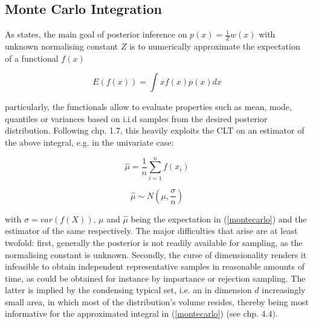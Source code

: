 \documentclass[11pt]{article}
\begin{document}
        \subsection{Monte Carlo Integration}
        As \citep{mackay2003information} states, the main goal of posterior inference on $p(x)= \frac{1}{Z} w(x)$ with unknown normalising constant $Z$ is to numerically approximate the expectation of a functional $f(x)$

        \begin{equation}\label{montecarlo}
            E(f(x)) = \int x f(x) p(x) dx
        \end{equation}

        particularly, the functionals allow to evaluate properties such as mean, mode, quantiles or variances based on i.i.d samples from the desired posterior distribution. Following \citep{brooks2011handbook} chp. 1.7, this heavily exploits the CLT on an estimator of the above integral, e.g. in the univariate case:

        \begin{equation}
            \hat{\mu} = \frac{1}{n}\sum_{i=1}^n f(x_i)
        \end{equation}

        \begin{equation} \label{clt}
            \hat{\mu} \sim N\left(\mu, \frac{\sigma}{n}\right)
        \end{equation}

        with $\sigma = var(f(X))$, $\mu$ and $\hat{\mu}$ being the expectation in (\ref{montecarlo}) and the  estimator of the same respectively.
        The major difficulties that arise are at least twofold: first, generally the posterior is not readily available for sampling, as the normalising constant is unknown. Secondly, the curse of dimensionality renders it infeasible to obtain independent representative samples in reasonable amounts of time, as could be obtained for instance by importance or rejection sampling. The latter is implied by the condensing typical set, i.e. an in dimension $d$ increasingly small area, in which most of the distribution's volume resides, thereby being most informative for the approximated integral in (\ref{montecarlo}) (see \citep{mackay2003information} chp. 4.4).
\end{document}
